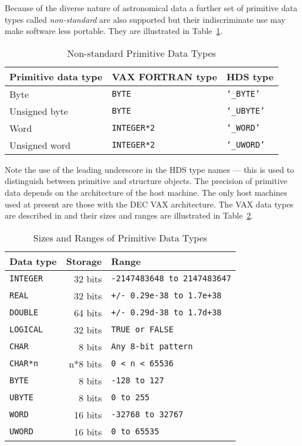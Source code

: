 Because of the diverse nature of astronomical data a further set of primitive
data types called {\em non-standard} are also supported but their
indiscriminate use may make software less portable. They are illustrated
in Table~\ref{non_standard_primitive_data_types}.

\begin {table}[htbp]
\begin {center}
\begin {tabular}{||l|l|l||}
\hline
Primitive data type	& VAX FORTRAN type	& HDS type \\
\hline
Byte			& {\tt BYTE}		& {\tt `\_BYTE'} \\
Unsigned byte		& {\tt BYTE}		& {\tt `\_UBYTE'} \\
Word			& {\tt INTEGER*2}	& {\tt `\_WORD'} \\
Unsigned word		& {\tt INTEGER*2}	& {\tt `\_UWORD'} \\
\hline
\end {tabular}
\caption {Non-standard Primitive Data Types}
\label {non_standard_primitive_data_types}
\end {center}
\end {table}

Note the use of the leading underscore in the HDS type names --- this is used
to distinguish between primitive and structure objects. The precision of
primitive data depends on the architecture of the host machine. The only host
machines used at present are those with the DEC VAX architecture. The VAX data
types are described in \cite{programming_in_fortran} and their sizes and ranges
are illustrated in Table~\ref{sizes_and_ranges_of_primitive_data_types}. 

\begin {table}[htbp]
\begin {center}
\begin {tabular}{||l|r|l||}
\hline                                            
Data type	& Storage	& Range \\
\hline
{\tt INTEGER}	& 32 bits	& {\tt -2147483648 to 2147483647} \\
{\tt REAL}	& 32 bits	& {\tt +/- 0.29e-38 to 1.7e+38} \\
{\tt DOUBLE}	& 64 bits	& {\tt +/- 0.29d-38 to 1.7d+38} \\
{\tt LOGICAL}	& 32 bits	& {\tt TRUE or FALSE} \\
{\tt CHAR}	& 8 bits	& {\tt Any 8-bit pattern} \\
{\tt CHAR*n}	& n*8 bits	& {\tt 0 < n < 65536} \\
\hline
{\tt BYTE}	& 8 bits	& {\tt -128 to 127} \\
{\tt UBYTE}	& 8 bits	& {\tt 0 to 255} \\
{\tt WORD}	& 16 bits	& {\tt -32768 to 32767} \\
{\tt UWORD}	& 16 bits	& {\tt 0 to 65535} \\
\hline
\end {tabular}
\caption {Sizes and Ranges of Primitive Data Types}
\label {sizes_and_ranges_of_primitive_data_types}
\end {center}
\end {table}                    

